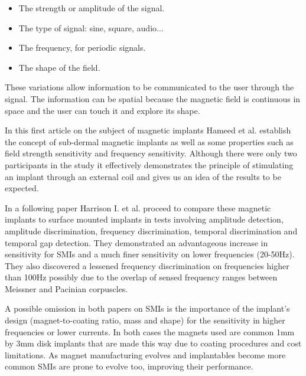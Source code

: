 \documentclass[10pt,journal,compsoc]{IEEEtran}
\begin{document}
	\begin{itemize}
		\item The strength or amplitude of the signal.
		\item The type of signal: sine, square, audio...
		\item The frequency, for periodic signals.
		\item The shape of the field.
	\end{itemize}
	
	These variations allow information to be communicated to the user through the signal. The information can be spatial because the magnetic field is continuous in space and the user can touch it and explore its shape.
	
	
	In this first article on the subject of magnetic implants \cite{hameed2010ieee} Hameed et al. establish the concept of sub-dermal magnetic implants as well as some properties such as field strength sensitivity and frequency sensitivity. Although there were only two participants in the study it effectively demonstrates the principle of stimulating an implant through an external coil and gives us an idea of the results to be expected.
	
	In a following paper \cite{harrison2018tf} Harrison I. et al. proceed to compare these magnetic implants to surface mounted implants in tests involving amplitude detection, amplitude discrimination, frequency discrimination, temporal discrimination and temporal gap detection. They demonstrated an advantageous increase in sensitivity for SMIs and a much finer sensitivity on lower frequencies (20-50Hz). They also discovered a lessened frequency discrimination on frequencies higher than 100Hz possibly due to the overlap of sensed frequency ranges between Meissner and Pacinian corpuscles.
	
	A possible omission in both papers on SMIs \cite{hameed2010ieee}\cite{harrison2018tf} is the importance of the implant's design (magnet-to-coating ratio, mass and shape) for the sensitivity in higher frequencies or lower currents. In both cases the magnets used are common 1mm by 3mm disk implants that are made this way due to coating procedures and cost limitations. As magnet manufacturing evolves and implantables become more common SMIs are prone to evolve too, improving their performance.
	
\end{document}
